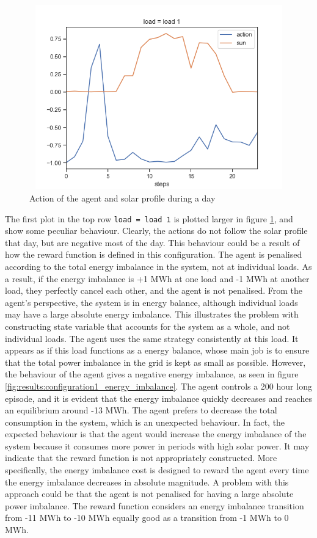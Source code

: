 \documentclass[class=book, crop=false]{standalone}
\begin{document}
\begin{figure}[H]
    \center
\includegraphics[height=8cm, width=12cm]{figures/configuration1_negative_actions.png}
    \caption[size = 9]{Action of the agent and solar profile during a day}
    \label{fig:results:configuration1_negative_actions}
\end{figure}

 The first plot in the top row \texttt{load = load 1} is plotted larger in figure \ref{fig:results:configuration1_negative_actions}, and show some peculiar behaviour. Clearly, the actions do not follow the solar profile that day, but are negative most of the day. This behaviour could be a result of how the reward function is defined in this configuration. The agent is penalised according to the total energy imbalance in the system, not at individual loads. As a result, if the energy imbalance is +1 MWh at one load and -1 MWh at another load, they perfectly cancel each other, and the agent is not penalised. From the agent's perspective, the system is in energy balance, although individual loads may have a large absolute energy imbalance. This illustrates the problem with constructing state variable that accounts for the system as a whole, and not individual loads. The agent uses the same strategy consistently at this load. It appears as if this load functions as a energy balance, whose main job is to ensure that the total power imbalance in the grid is kept as small as possible. However, the behaviour of the agent gives a negative energy imbalance, as seen in figure \ref{fig:results:configuration1_energy_imbalance}. The agent controls a 200 hour long episode, and it is evident that the energy imbalance quickly decreases and reaches an equilibrium around -13 MWh. The agent prefers to decrease the total consumption in the system, which is an unexpected behaviour. In fact, the expected behaviour is that the agent would increase the energy imbalance of the system because it consumes more power in periods with high solar power. It may indicate that the reward function is not appropriately constructed. More specifically, the energy imbalance cost is designed to reward the agent every time the energy imbalance decreases in absolute magnitude. A problem with this approach could be that the agent is not penalised for having a large absolute power imbalance. The reward function considers an energy imbalance transition from -11 MWh to -10 MWh equally good as a transition from -1 MWh to 0 MWh.
 
\end{document}
